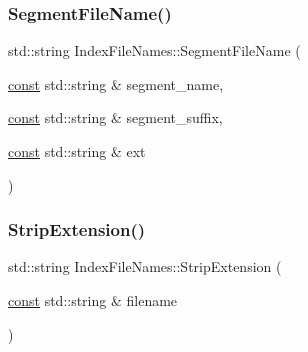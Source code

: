 \mbox{\label{classlucene_1_1core_1_1index_1_1IndexFileNames_a3a2dbc7b51a90635994c0e7a4bc38682}} 
\subsubsection{\texorpdfstring{Segment\+File\+Name()}{SegmentFileName()}}
{\footnotesize\ttfamily std\+::string Index\+File\+Names\+::\+Segment\+File\+Name (\begin{DoxyParamCaption}\item[{\mbox{\hyperlink{ZlibCrc32_8h_a2c212835823e3c54a8ab6d95c652660e}{const}} std\+::string \&}]{segment\+\_\+name,  }\item[{\mbox{\hyperlink{ZlibCrc32_8h_a2c212835823e3c54a8ab6d95c652660e}{const}} std\+::string \&}]{segment\+\_\+suffix,  }\item[{\mbox{\hyperlink{ZlibCrc32_8h_a2c212835823e3c54a8ab6d95c652660e}{const}} std\+::string \&}]{ext }\end{DoxyParamCaption})\hspace{0.3cm}{\ttfamily [static]}}

\mbox{\label{classlucene_1_1core_1_1index_1_1IndexFileNames_a256288c7ed34b82a6d43143f0c2f4f3d}} 
\subsubsection{\texorpdfstring{Strip\+Extension()}{StripExtension()}}
{\footnotesize\ttfamily std\+::string Index\+File\+Names\+::\+Strip\+Extension (\begin{DoxyParamCaption}\item[{\mbox{\hyperlink{ZlibCrc32_8h_a2c212835823e3c54a8ab6d95c652660e}{const}} std\+::string \&}]{filename }\end{DoxyParamCaption})\hspace{0.3cm}{\ttfamily [static]}}

